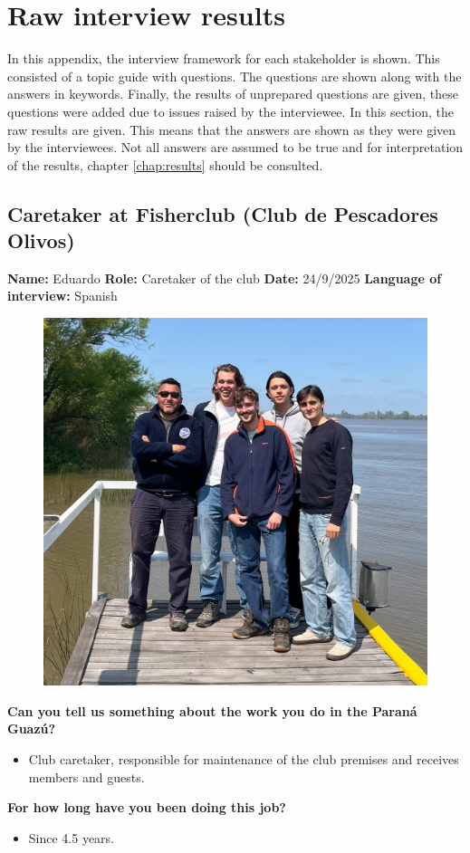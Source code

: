 \chapter{Raw interview results}
\label{chap:interviewres}
In this appendix, the interview framework for each stakeholder is shown. This consisted of a topic guide with questions. The questions are shown along with the answers in keywords. Finally, the results of unprepared questions are given, these questions were added due to issues raised by the interviewee. In this section, the raw results are given. This means that the answers are shown as they were given by the interviewees. Not all answers are assumed to be true and for interpretation of the results, chapter \ref{chap:results} should be consulted.

\section{Caretaker at Fisherclub (Club de Pescadores Olivos)}
\textbf{Name:} Eduardo \newline
\textbf{Role:} Caretaker of the club \newline
\textbf{Date:} 24/9/2025 \newline
\textbf{Language of interview:} Spanish

\begin{figure}[H]
    \centering
    \includegraphics[width=0.4\linewidth]{figures/appendixE/InterviewFisher.jpeg}
\end{figure}

\textbf{Can you tell us something about the work you do in the Paraná Guazú?}
\begin{itemize}
    \item Club caretaker, responsible for maintenance of the club premises and receives members and guests.
\end{itemize}

\textbf{For how long have you been doing this job?}
\begin{itemize}
    \item Since 4.5 years.
\end{itemize}

